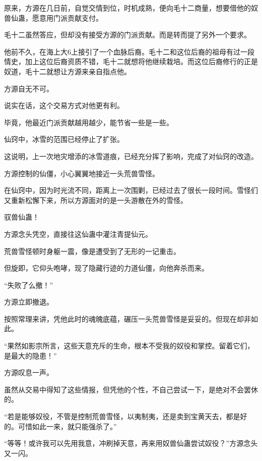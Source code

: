 \begin{this_body}
原来，方源在几日前，自觉交情到位，时机成熟，便向毛十二商量，想要借他的奴兽仙蛊，愿意用门派贡献支付。

毛十二虽然答应，但却没有接受方源的门派贡献。而是转而提了另外一个要求。

他前不久，在海上大6上接引了一个血脉后裔。毛十二和这位后裔的祖母有过一段情史，加上这位后裔资质不错，毛十二就想将他继续栽培。而这位后裔修行的正是奴道，毛十二就想让方源来亲自指点他。

方源自无不可。

说实在话，这个交易方式对他更有利。

毕竟，他最近门派贡献越用越少，能节省一些是一些。

仙窍中，冰雪的范围已经停止了扩张。

这说明，上一次地灾增添的冰雪道痕，已经充分挥了影响，完成了对仙窍的改造。

方源控制的仙僵，小心翼翼地接近一头荒兽雪怪。

在仙窍中，因为时光流不同，距离上一次围剿，已经过去了很长一段时间。雪怪们又重新松懈下来，所以方源面对的是一头游散在外的雪怪。

驭兽仙蛊！

方源念头凭空，直接往这仙蛊中灌注青提仙元。

荒兽雪怪顿时身躯一震，像是遭受到了无形的一记重击。

但旋即，它仰头咆哮，现了隐藏行迹的力道仙僵，向他奔杀而来。

“失败了么撤！”

方源立即撤退。

按照常理来讲，凭他此时的魂魄底蕴，碾压一头荒兽雪怪是妥妥的。但现在却非如此。

“果然如影宗所言，这些天意充斥的生命，根本不受我的奴役和掌控。留着它们，是最大的隐患！”

方源叹息一声。

虽然从交易中得知了这些情报，但凭他的个性，不自己尝试一下，是绝对不会罢休的。

“若是能够奴役，不管是控制荒兽雪怪，以夷制夷，还是卖到宝黄天去，都是好的。可惜如此一来，就只能强杀了。”

“等等！或许我可以先用我意，冲刷掉天意，再来用奴兽仙蛊尝试奴役？”方源念头又一闪。

\end{this_body}

